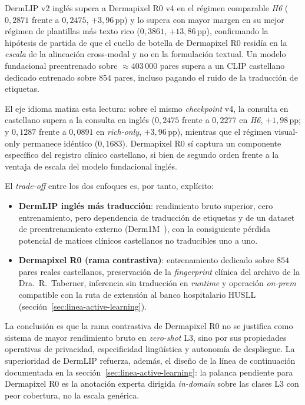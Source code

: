 DermLIP v2 inglés supera a Dermapixel R0 v4 en el régimen
comparable \emph{H6} ($0{,}2871$ frente a $0{,}2475$,
$+3{,}96$\,pp) y lo supera con mayor margen en su mejor régimen
de plantillas más texto rico ($0{,}3861$, $+13{,}86$\,pp),
confirmando la hipótesis de partida de que el cuello de botella de
Dermapixel R0 residía en la \emph{escala} de la alineación
cross-modal y no en la formulación textual. Un modelo fundacional
preentrenado sobre $\approx 403\,000$ pares supera a un CLIP
castellano dedicado entrenado sobre $854$ pares, incluso pagando el
ruido de la traducción de etiquetas.

El eje idioma matiza esta lectura: sobre el mismo \emph{checkpoint}
v4, la consulta en castellano supera a la consulta en inglés
($0{,}2475$ frente a $0{,}2277$ en \emph{H6}, $+1{,}98$\,pp;
y $0{,}1287$ frente a $0{,}0891$ en \emph{rich-only},
$+3{,}96$\,pp), mientras que el régimen visual-only permanece
idéntico ($0{,}1683$). Dermapixel R0 sí captura un componente
específico del registro clínico castellano, si bien de segundo orden
frente a la ventaja de escala del modelo fundacional inglés.

El \emph{trade-off} entre los dos enfoques es, por tanto,
explícito:

\begin{itemize}
  \item \textbf{DermLIP inglés más traducción}: rendimiento bruto
        superior, cero entrenamiento, pero dependencia de
        traducción de etiquetas y de un dataset de preentrenamiento
        externo (Derm1M~\cite{derm1m}), con la consiguiente
        pérdida potencial de matices clínicos castellanos no
        traducibles uno a uno.
  \item \textbf{Dermapixel R0 (rama contrastiva)}: entrenamiento dedicado sobre $854$
        pares reales castellanos, preservación de la
        \emph{fingerprint} clínica del archivo de la
        Dra.~R.~Taberner, inferencia sin traducción en
        \emph{runtime} y operación \emph{on-prem} compatible con la
        ruta de extensión al banco hospitalario HUSLL
        (sección~\ref{sec:linea-active-learning}).
\end{itemize}

La conclusión es que la rama contrastiva de Dermapixel R0 no se
justifica como sistema de
mayor rendimiento bruto en \emph{zero-shot} L3, sino por sus
propiedades operativas de privacidad, especificidad lingüística y
autonomía de despliegue. La superioridad de DermLIP refuerza,
además, el diseño de la línea de continuación documentada en la
sección~\ref{sec:linea-active-learning}: la palanca pendiente
para Dermapixel R0 es la anotación experta dirigida
\emph{in-domain} sobre las clases L3 con peor cobertura, no la
escala genérica.

